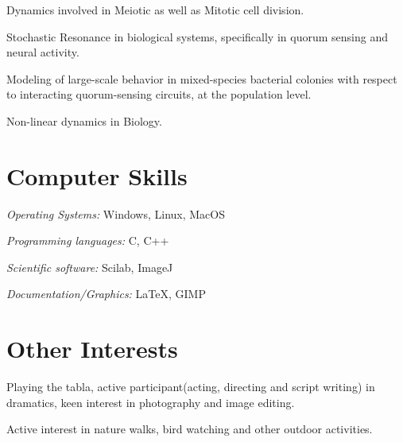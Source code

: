 \documentclass{res}
\begin{document}
\begin{resume}
Dynamics involved in Meiotic as well as Mitotic cell division.

Stochastic Resonance in biological systems, specifically in quorum sensing and neural activity.

Modeling of large-scale behavior in mixed-species bacterial colonies with respect to interacting quorum-sensing circuits, at the population level.

Non-linear dynamics in Biology.

\section{Computer Skills}
\vspace{0.1in}
{\textit {Operating Systems:}} Windows, Linux, MacOS

{\textit {Programming languages:}} C, C++

{\textit {Scientific software:}} Scilab, ImageJ

{\textit {Documentation/Graphics:}} \LaTeX, GIMP
\section{Other Interests}
\vspace{0.1in}
Playing the tabla, active participant(acting, directing and script writing) in dramatics, keen interest in photography and image editing. 

Active interest in nature walks, bird watching and other outdoor activities.
 \end{resume}
\end{document}
